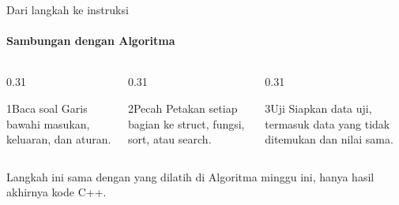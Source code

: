 \documentclass[t]{beamer}
\begin{document}
\begin{frame}{Dari langkah ke instruksi}
\framesubtitle{Sambungan dengan Algoritma}
\begin{columns}[T]
\begin{column}{0.31\textwidth}
\begin{Langkah}{1}{Baca soal}
Garis bawahi masukan, keluaran, dan aturan.
\end{Langkah}
\end{column}
\begin{column}{0.31\textwidth}
\begin{Langkah}{2}{Pecah}
Petakan setiap bagian ke struct, fungsi, sort, atau search.
\end{Langkah}
\end{column}
\begin{column}{0.31\textwidth}
\begin{Langkah}{3}{Uji}
Siapkan data uji, termasuk data yang tidak ditemukan dan nilai sama.
\end{Langkah}
\end{column}
\end{columns}
\vspace{10pt}
Langkah ini sama dengan yang dilatih di Algoritma minggu ini, hanya hasil akhirnya kode C++.
\end{frame}

\end{document}

